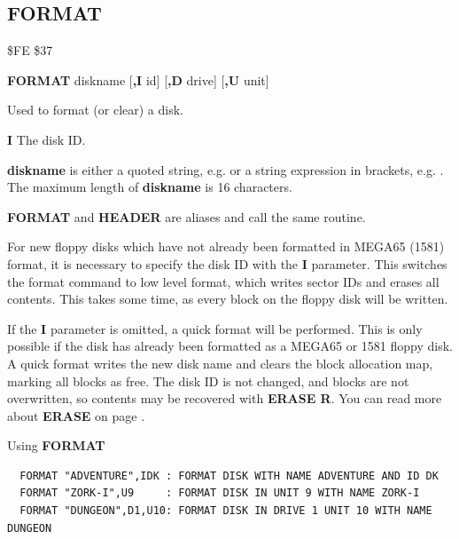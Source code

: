 \subsection{FORMAT}
\begin{description}[leftmargin=2cm,style=nextline]
\item [Token:] \$FE \$37
\item [Format:] {\bf FORMAT} diskname [{\bf,I} id] [{\bf,D} drive] [{\bf,U} unit]
\item [Usage:]
   Used to format (or clear) a disk.

   {\bf I} The disk ID.

   {\bf diskname} is either a quoted string, e.g.  or
   a string expression in brackets, e.g. .
   The maximum length of {\bf diskname} is 16 characters.

   \drivedefinition

   \unitdefinition

\item [Remarks:] {\bf FORMAT} and {\bf HEADER} are aliases and call the same routine.

   For new floppy disks which have not already been formatted in MEGA65 (1581) format,
   it is necessary to specify the disk ID with the
   {\bf I} parameter. This switches the format command to low level
   format, which writes sector IDs and erases all contents.
   This takes some time, as every block on the floppy disk will be written.

   If the {\bf I} parameter is omitted, a quick format will
   be performed. This is only possible if the disk has already been formatted
   as a MEGA65 or 1581 floppy disk.
   A quick format writes the new disk name and clears the
   block allocation map, marking all blocks as free.
   The disk ID is not changed, and blocks are not overwritten,
   so contents may be recovered with {\bf ERASE R}.
   You can read more about {\bf ERASE} on page \pageref{erasecommand}.

\item [Examples:] Using {\bf FORMAT}
\begin{tcolorbox}[colback=black,coltext=white]
\verbatimfont{\codefont}
\begin{verbatim}
  FORMAT "ADVENTURE",IDK : FORMAT DISK WITH NAME ADVENTURE AND ID DK
  FORMAT "ZORK-I",U9     : FORMAT DISK IN UNIT 9 WITH NAME ZORK-I
  FORMAT "DUNGEON",D1,U10: FORMAT DISK IN DRIVE 1 UNIT 10 WITH NAME DUNGEON
\end{verbatim}
\end{tcolorbox}
\end{description}


